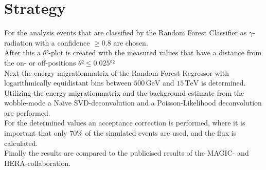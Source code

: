 \section{Strategy}
For the analysis events that are classified by the Random Forest Classifier as $\gamma$-radiation with a confidence $\geq 0.8$ are chosen. \\
After this a $\theta²$-plot is created with the measured values that have a distance from the on- or off-positions $\theta² \leq 0.025°²$ \\
Next the energy migrationmatrix of the Random Forest Regressor with logarithmically equidistant bins between $500 \, \si{\giga\eV}$ 
and $15 \, \si{\tera\eV}$ is determined. Utilizing the energy migrationmatrix and the background estimate from the wobble-mode 
a Naive SVD-deconvolution and a Poisson-Likelihood deconvolution are performed.\\
For the determined values an acceptance correction is performed, where it is important that only $70 \%$ of the simulated events are used, 
and the flux is calculated.\\
Finally the results are compared to the publicised results of the MAGIC- and HERA-collaboration.
